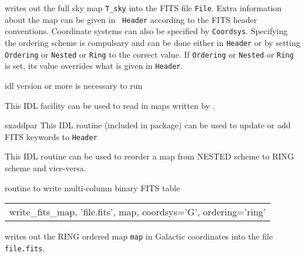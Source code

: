 \begin{codedescription}
{\facname writes out the full sky \healpix map {\tt T\_sky} into the FITS file
{\tt File}. Extra information about the map can be given in {\tt
Header} according to the FITS header conventions. Coordinate systems 
can also be specified by {\tt Coordsys}. Specifying the
ordering scheme is compulsary and can be done either in {\tt Header} 
or by setting {\tt Ordering} or {\tt Nested} or {\tt Ring} to the 
correct value. If {\tt Ordering} or {\tt Nested} or {\tt Ring} is set,
its value overrides what is given in {\tt Header}.}
\end{codedescription}



\begin{related}
  \begin{sulist}{} %
  \item[idl] version \idlversion or more is necessary to run \facname
  \item[\htmlref{read\_fits\_map}{idl:read_fits_map}] This \healpix IDL facility can be used to read in maps
  written by \facname.
  \item[sxaddpar] This IDL routine (included in \healpix package) can be used to update
  or add FITS keywords to {\tt Header}
  \item[\htmlref{reorder}{idl:reorder}] This \healpix IDL routine can be used to reorder a map from
  NESTED scheme to RING scheme and vice-versa.

  \item[\htmlref{write\_fits\_sb}{idl:write_fits_sb}] routine to write multi-column binary FITS table
  \end{sulist}
\end{related}


\begin{example}
{
\begin{tabular}{l} %
write\_fits\_map, 'file.fits', map, coordsys='G', ordering='ring' \\
\end{tabular}
}
{\facname writes out the RING ordered map {\tt map} in Galactic
coordinates into the file {\tt file.fits}.
}
\end{example}

